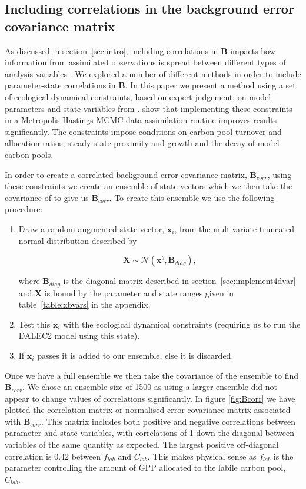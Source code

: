 \documentclass[review]{elsarticle}
\begin{document}
\subsection{Including correlations in the background error covariance matrix} \label{sec:corB}

As discussed in section~\ref{sec:intro}, including correlations in \textbf{B} impacts how information from assimilated observations is spread between different types of analysis variables \citep{bannister2008review}. We explored a number of different methods in order to include parameter-state correlations in \textbf{B}. In this paper we present a method using a set of ecological dynamical constraints, based on expert judgement, on model parameters and state variables from \citet{Bloom2015}. \citet{Bloom2015} show that implementing these constraints in a Metropolis Hastings MCMC data assimilation routine improves results significantly. The constraints impose conditions on carbon pool turnover and allocation ratios, steady state proximity and growth and the decay of model carbon pools.

In order to create a correlated background error covariance matrix, $\textbf{B}_{corr}$, using these constraints we create an ensemble of state vectors which we then take the covariance of to give us $\textbf{B}_{corr}$. To create this ensemble we use the following procedure:
\begin{enumerate}
\item Draw a random augmented state vector, $\textbf{x}_i$, from the multivariate truncated normal distribution described by
\begin{linenomath}
\begin{equation}
\textbf{X} \sim \mathcal{N}(\textbf{x}^b, \textbf{B}_{diag}),
\end{equation} 
\end{linenomath}
where $\textbf{B}_{diag}$ is the diagonal matrix described in section~\ref{sec:implement4dvar} and $\textbf{X}$ is bound by the parameter and state ranges given in table~\ref{table:xbvars} in the appendix.
\item Test this $\textbf{x}_i$ with the ecological dynamical constraints (requiring us to run the DALEC2 model using this state).
\item If $\textbf{x}_i$ passes it is added to our ensemble, else it is discarded.
\end{enumerate}
Once we have a full ensemble we then take the covariance of the ensemble to find $\textbf{B}_{corr}$. We chose an ensemble size of 1500 as using a larger ensemble did not appear to change values of correlations significantly. In figure \ref{fig:Bcorr} we have plotted the correlation matrix or normalised error covariance matrix associated with $\textbf{B}_{corr}$. This matrix includes both positive and negative correlations between parameter and state variables, with correlations of 1 down the diagonal between variables of the same quantity as expected. The largest positive off-diagonal correlation is $0.42$ between $f_{lab}$ and $C_{lab}$. This makes physical sense as $f_{lab}$ is the parameter controlling the amount of GPP allocated to the labile carbon pool, $C_{lab}$.
\end{document}
